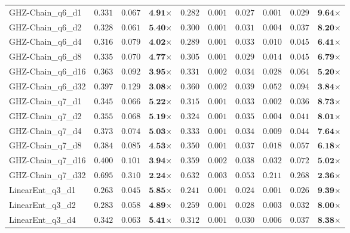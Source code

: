 \begin{table*}[t]
{\begin{tabular}{| l || r r c || r r r r r c |}
GHZ-Chain\_q6\_d1 & $0.331$ & $0.067$ & $\textbf{4.91}$$\times$ & $0.282$ & $0.001$ & $0.027$ & $0.001$ & $0.029$ & $\textbf{9.64}$$\times$ \\
GHZ-Chain\_q6\_d2 & $0.328$ & $0.061$ & $\textbf{5.40}$$\times$ & $0.300$ & $0.001$ & $0.031$ & $0.004$ & $0.037$ & $\textbf{8.20}$$\times$ \\
GHZ-Chain\_q6\_d4 & $0.316$ & $0.079$ & $\textbf{4.02}$$\times$ & $0.289$ & $0.001$ & $0.033$ & $0.010$ & $0.045$ & $\textbf{6.41}$$\times$ \\
GHZ-Chain\_q6\_d8 & $0.335$ & $0.070$ & $\textbf{4.77}$$\times$ & $0.305$ & $0.001$ & $0.029$ & $0.014$ & $0.045$ & $\textbf{6.79}$$\times$ \\
GHZ-Chain\_q6\_d16 & $0.363$ & $0.092$ & $\textbf{3.95}$$\times$ & $0.331$ & $0.002$ & $0.034$ & $0.028$ & $0.064$ & $\textbf{5.20}$$\times$ \\
GHZ-Chain\_q6\_d32 & $0.397$ & $0.129$ & $\textbf{3.08}$$\times$ & $0.360$ & $0.002$ & $0.039$ & $0.052$ & $0.094$ & $\textbf{3.84}$$\times$ \\
GHZ-Chain\_q7\_d1 & $0.345$ & $0.066$ & $\textbf{5.22}$$\times$ & $0.315$ & $0.001$ & $0.033$ & $0.002$ & $0.036$ & $\textbf{8.73}$$\times$ \\
GHZ-Chain\_q7\_d2 & $0.355$ & $0.068$ & $\textbf{5.19}$$\times$ & $0.324$ & $0.001$ & $0.035$ & $0.004$ & $0.041$ & $\textbf{8.01}$$\times$ \\
GHZ-Chain\_q7\_d4 & $0.373$ & $0.074$ & $\textbf{5.03}$$\times$ & $0.333$ & $0.001$ & $0.034$ & $0.009$ & $0.044$ & $\textbf{7.64}$$\times$ \\
GHZ-Chain\_q7\_d8 & $0.384$ & $0.085$ & $\textbf{4.53}$$\times$ & $0.350$ & $0.001$ & $0.037$ & $0.018$ & $0.057$ & $\textbf{6.18}$$\times$ \\
GHZ-Chain\_q7\_d16 & $0.400$ & $0.101$ & $\textbf{3.94}$$\times$ & $0.359$ & $0.002$ & $0.038$ & $0.032$ & $0.072$ & $\textbf{5.02}$$\times$ \\
GHZ-Chain\_q7\_d32 & $0.695$ & $0.310$ & $\textbf{2.24}$$\times$ & $0.632$ & $0.003$ & $0.053$ & $0.211$ & $0.268$ & $\textbf{2.36}$$\times$ \\
LinearEnt\_q3\_d1 & $0.263$ & $0.045$ & $\textbf{5.85}$$\times$ & $0.241$ & $0.001$ & $0.024$ & $0.001$ & $0.026$ & $\textbf{9.39}$$\times$ \\
LinearEnt\_q3\_d2 & $0.283$ & $0.058$ & $\textbf{4.89}$$\times$ & $0.259$ & $0.001$ & $0.028$ & $0.003$ & $0.032$ & $\textbf{8.00}$$\times$ \\
LinearEnt\_q3\_d4 & $0.342$ & $0.063$ & $\textbf{5.41}$$\times$ & $0.312$ & $0.001$ & $0.030$ & $0.006$ & $0.037$ & $\textbf{8.38}$$\times$ \\

\end{tabular}}
\end{table*}
